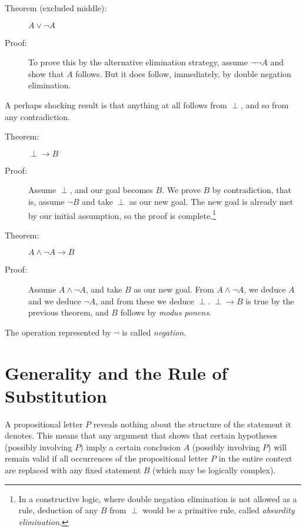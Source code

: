\documentclass[12pt]{book}
\begin{document}
\begin{description}

\item[Theorem (excluded middle):]  $A \vee \neg A$

\item[Proof:]  To prove this by the alternative elimination strategy, assume $\neg \neg A$ and show that $A$ follows.  But it does follow, immediately,
by double negation elimination.

\end{description}

A perhaps shocking result is that anything at all follows from $\perp$, and so from any
contradiction.

\begin{description}

\item[Theorem:]  $\perp \rightarrow B$

\item[Proof:]  Assume $\perp$, and our goal becomes $B$.  We prove $B$ by contradiction,
that is, assume $\neg B$ and take $\perp$ as our new goal.  The new goal is already met by our initial assumption, so the proof is complete.\footnote{In a constructive logic, where double negation elimination is not allowed as a rule, deduction of any $B$ from $\perp$ would be a primitive rule, called {\em absurdity elimination\/}.}

\item[Theorem:]  $A \wedge \neg A \rightarrow B$

\item[Proof:] Assume $A \wedge \neg A$, and take $B$ as our new goal.
From $A \wedge \neg A$, we deduce $A$ and we deduce $\neg A$, and from these we deduce $\perp$.
$\perp \rightarrow B$ is true by the previous theorem, and $B$ follows by {\em modus ponens}.

\end{description}

The operation represented by $\neg$ is called {\em negation\/}.

\section{Generality and the Rule of Substitution}

A propositional letter $P$ reveals nothing about the structure of the
statement it denotes.  This means that any argument that shows that
certain hypotheses (possibly involving $P$) imply a certain conclusion
$A$ (possibly involving $P$) will remain valid if all occurrences of
the propositional letter $P$ in the entire context are replaced with
any fixed statement $B$ (which may be logically complex).
\end{document}
